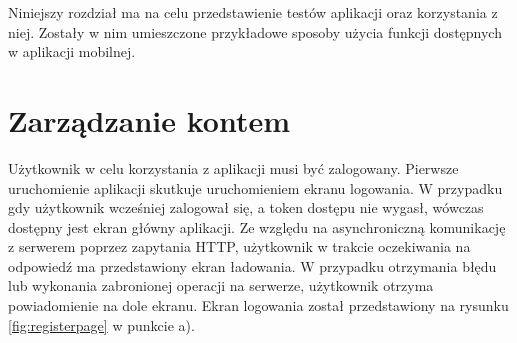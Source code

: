 
Niniejszy rozdział ma na celu przedstawienie testów aplikacji oraz korzystania z niej. Zostały w nim umieszczone przykładowe sposoby użycia funkcji dostępnych w aplikacji mobilnej.



\section{Zarządzanie kontem}{
	


Użytkownik w celu korzystania z aplikacji musi być zalogowany. Pierwsze uruchomienie aplikacji skutkuje uruchomieniem ekranu logowania. W przypadku gdy użytkownik wcześniej zalogował się, a token dostępu nie wygasł, wówczas dostępny jest ekran główny aplikacji. Ze względu na asynchroniczną komunikację z serwerem poprzez zapytania HTTP, użytkownik w trakcie oczekiwania na odpowiedź ma przedstawiony ekran ładowania. W przypadku otrzymania błędu lub wykonania zabronionej operacji na serwerze, użytkownik otrzyma powiadomienie na dole ekranu. Ekran logowania został przedstawiony na rysunku \ref{fig:registerpage} w punkcie a).

}

